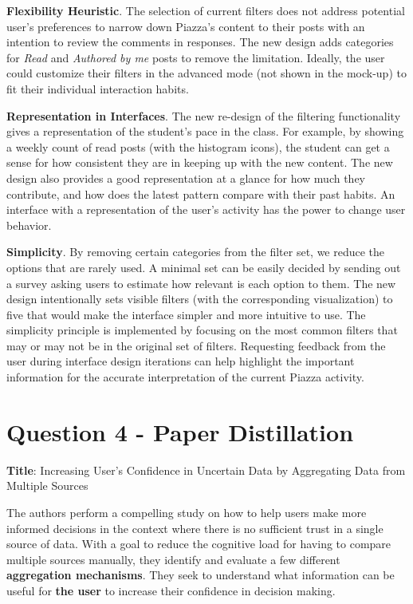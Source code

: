 \documentclass[12pt,letterpaper]{article}
\begin{document}
\textbf{Flexibility Heuristic}. The selection of current filters does not address potential user's preferences to narrow down Piazza's content to their posts with an intention to review the comments in responses. The new design adds categories for \textit{Read} and \textit{Authored by me} posts to remove the limitation. Ideally, the user could customize their filters in the advanced mode (not shown in the mock-up) to fit their individual interaction habits. 

\textbf{Representation in Interfaces}. The new re-design of the filtering functionality gives a representation of the student's pace in the class. For example, by showing a weekly count of read posts (with the histogram icons), the student can get a sense for how consistent they are in keeping up with the new content. The new design also provides a good representation at a glance for how much they contribute, and how does the latest pattern compare with their past habits. An interface with a representation of the user's activity has the power to change user behavior. 

\textbf{Simplicity}. By removing certain categories from the filter set, we reduce the options that are rarely used. A minimal set can be easily decided by sending out a survey asking users to estimate how relevant is each option to them. The new design intentionally sets visible filters  (with the corresponding visualization) to five that would make the interface simpler and more intuitive to use. The simplicity principle is implemented by focusing on the most common filters that may or may not be in the original set of filters. Requesting feedback from the user during interface design iterations can help highlight the important information for the accurate interpretation of the current Piazza activity.

\section*{Question 4 - Paper Distillation}

\textbf{Title}: Increasing User's Confidence in Uncertain Data by Aggregating Data from Multiple Sources \cite{greis2017increasing}

The authors perform a compelling study on how to help users make more informed decisions in the context where there is no sufficient trust in a single source of data. With a goal to reduce the cognitive load for having to compare multiple sources manually, they identify and evaluate a few different \textbf{aggregation mechanisms}. They seek to understand what information can be useful for \textbf{the user} to increase their confidence in decision making. 
\end{document}

